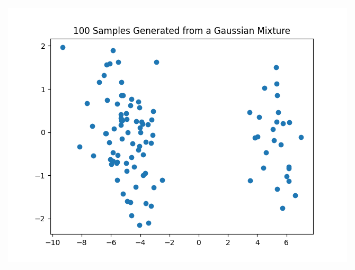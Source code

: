 \documentclass[a4paper]{article}
\theoremstyle{definition}
\newenvironment{soln}{
	\leavevmode\color{blue}\ignorespaces
}{}
\begin{document}
\begin{enumerate}
		\begin{soln}
		\begin{figure}[h!]
		    \centering
		    \includegraphics[width=0.8\textwidth]{plots/gm_samples.png}  
		    \captionsetup{labelformat=empty}
		    \caption{}
		    \label{fig:gm_samples}
		\end{figure}
	\end{soln}
	\end{enumerate}
	
	
	
	
	
	
	
\end{document}
